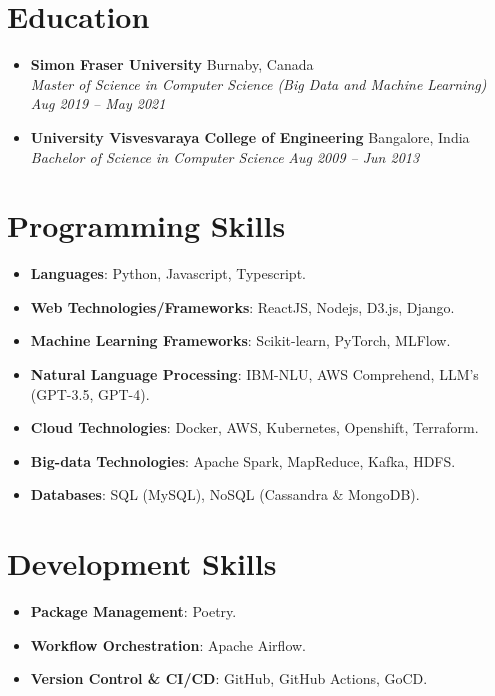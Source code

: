 \documentclass[10pt,a4paper]{article}
\begin{document}
\section{Education}

\begin{itemize}[leftmargin=*, itemsep=2pt, label=\textbullet]
  \item \textbf{Simon Fraser University} \hfill Burnaby, Canada \\
    \textit{Master of Science in Computer Science (Big Data and Machine Learning)} \hfill \textit{Aug 2019 -- May 2021}
  \item \textbf{University Visvesvaraya College of Engineering} \hfill Bangalore, India \\
    \textit{Bachelor of Science in Computer Science} \hfill \textit{Aug 2009 -- Jun 2013}
\end{itemize}

\section{Programming Skills}

\begin{itemize}[leftmargin=*, itemsep=1pt, label=\textbullet]
  \item \textbf{Languages}: Python, Javascript, Typescript.
  \item \textbf{Web Technologies/Frameworks}: ReactJS, Nodejs, D3.js, Django.
  \item \textbf{Machine Learning Frameworks}: Scikit-learn, PyTorch, MLFlow.
  \item \textbf{Natural Language Processing}: IBM-NLU, AWS Comprehend, LLM's (GPT-3.5, GPT-4).
  \item \textbf{Cloud Technologies}: Docker, AWS, Kubernetes, Openshift, Terraform.
  \item \textbf{Big-data Technologies}: Apache Spark, MapReduce, Kafka, HDFS.
  \item \textbf{Databases}: SQL (MySQL), NoSQL (Cassandra \& MongoDB).
\end{itemize}

\section{Development Skills}

\begin{itemize}[leftmargin=*, itemsep=1pt, label=\textbullet]
  \item \textbf{Package Management}: Poetry.
  \item \textbf{Workflow Orchestration}: Apache Airflow.
  \item \textbf{Version Control \& CI/CD}: GitHub, GitHub Actions, GoCD.
\end{itemize}
\end{document}
